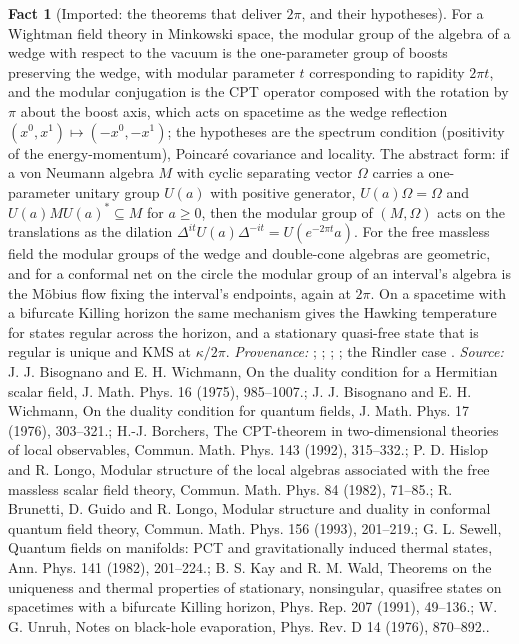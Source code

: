 \documentclass[11pt]{article}
\theoremstyle{definition}
\newtheorem{fact}[theorem]{Fact}
\theoremstyle{plain}
\begin{document}
\begin{fact}[Imported: the theorems that deliver $2\pi$, and their hypotheses]\label{c:angle.imported-theorems-deliver-their-hypotheses}
For a Wightman field theory in Minkowski space, the modular group of the algebra of a wedge with respect to the vacuum is the one-parameter group of boosts preserving the wedge, with modular parameter $t$ corresponding to rapidity $2\pi t$, and the modular conjugation is the CPT operator composed with the rotation by $\pi$ about the boost axis, which acts on spacetime as the wedge reflection $(x^{0}, x^{1}) \mapsto (-x^{0}, -x^{1})$; the hypotheses are the spectrum condition (positivity of the energy-momentum), Poincar\'e covariance and locality. The abstract form: if a von Neumann algebra $M$ with cyclic separating vector $\Omega$ carries a one-parameter unitary group $U(a)$ with positive generator, $U(a)\Omega = \Omega$ and $U(a)MU(a)^{*} \subseteq M$ for $a \geq 0$, then the modular group of $(M, \Omega)$ acts on the translations as the dilation $\Delta^{it}U(a)\Delta^{-it} = U(e^{-2\pi t}a)$. For the free massless field the modular groups of the wedge and double-cone algebras are geometric, and for a conformal net on the circle the modular group of an interval's algebra is the M\"obius flow fixing the interval's endpoints, again at $2\pi$. On a spacetime with a bifurcate Killing horizon the same mechanism gives the Hawking temperature for states regular across the horizon, and a stationary quasi-free state that is regular is unique and KMS at $\kappa/2\pi$. \emph{Provenance:} \cite{BW1975, BW1976}; \cite{Borchers1992}; \cite{HislopLongo1982, BGL1993}; \cite{Sewell1982, KayWald1991}; the Rindler case \cite{Unruh1976}.
\emph{Source:} J. J. Bisognano and E. H. Wichmann, On the duality condition for a Hermitian scalar field, J. Math. Phys. 16 (1975), 985--1007.; J. J. Bisognano and E. H. Wichmann, On the duality condition for quantum fields, J. Math. Phys. 17 (1976), 303--321.; H.-J. Borchers, The CPT-theorem in two-dimensional theories of local observables, Commun. Math. Phys. 143 (1992), 315--332.; P. D. Hislop and R. Longo, Modular structure of the local algebras associated with the free massless scalar field theory, Commun. Math. Phys. 84 (1982), 71--85.; R. Brunetti, D. Guido and R. Longo, Modular structure and duality in conformal quantum field theory, Commun. Math. Phys. 156 (1993), 201--219.; G. L. Sewell, Quantum fields on manifolds: PCT and gravitationally induced thermal states, Ann. Phys. 141 (1982), 201--224.; B. S. Kay and R. M. Wald, Theorems on the uniqueness and thermal properties of stationary, nonsingular, quasifree states on spacetimes with a bifurcate Killing horizon, Phys. Rep. 207 (1991), 49--136.; W. G. Unruh, Notes on black-hole evaporation, Phys. Rev. D 14 (1976), 870--892..
\end{fact}
\end{document}

